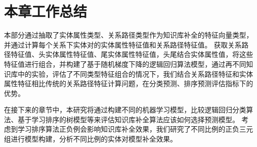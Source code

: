 \section{本章工作总结}
本部分通过抽取了实体属性类型、关系路径类型作为知识库补全的特征向量类型，并通过计算每个关系下实体对的实体属性特征值和关系路径特征值。
获取关系路径特征值、头实体属性特征值、尾实体属性特征值，头尾结合实体属性值，将这些特征值进行组合，并构建了基于随机梯度下降的逻辑回归算法模型，通过再不同知识库中的实验，评估了不同类型特征组合的情况下，我们结合关系路径特征和实体属性特征相比传统的关系路径特征计算问题，在分类预测、排序预测评估指标下的优势。

在接下来的章节中，本研究将通过构建不同的机器学习模型，比较逻辑回归分类算法、基于学习排序的树模型等来评估知识库补全算法应该如何选择预测模型。
考虑到学习排序算法正负例会影响知识库补全效果，我们研究了不同比例的正负三元组进行模型构建，分析不同比例的实体对模型补全效果。 